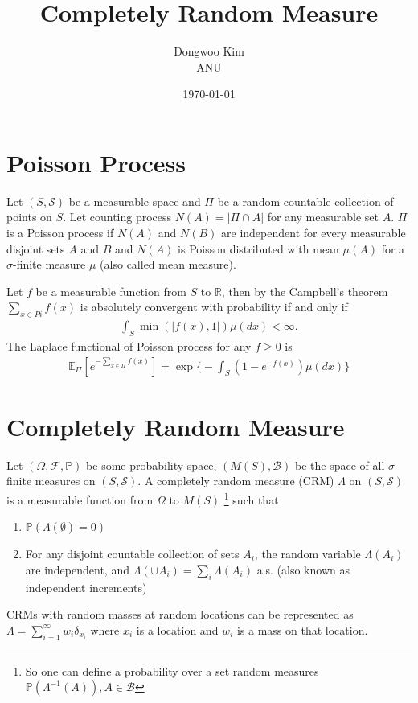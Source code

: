 \documentclass{article}
\title{Completely Random Measure}
\date{\today}
\author{Dongwoo Kim\\ANU}
\begin{document}
\maketitle

\section{Poisson Process}
\label{sec:pp}
Let $(S, \mathcal{S})$ be a measurable space and $\Pi$ be a random countable collection of points on $S$. Let  counting process $N(A) = |\Pi \cap A|$ for any measurable set $A$. $\Pi$ is a Poisson process if $N(A)$ and $N(B)$ are independent for every measurable disjoint sets $A$ and $B$ and $N(A)$ is Poisson distributed with mean $\mu(A)$ for a $\sigma$-finite measure $\mu$ (also called mean measure).

Let $f$ be a measurable function from $S$ to $\mathbb{R}$, then by the Campbell's theorem $\sum_{x\in Pi} f(x)$ is absolutely convergent with probability if and only if
\begin{align}
\int_{S} \min(|f(x), 1|)\mu(dx) < \infty.
\end{align}
The Laplace functional of Poisson process for any $f \ge 0$ is
\begin{align}
\mathbb{E}_{\Pi}[e^{-\sum_{x \in \Pi}f(x)}] = \exp \Bigg\{ - \int_{S} (1-e^{-f(x)})\mu(dx) \Bigg\}
\end{align}

\section{Completely Random Measure}
Let $(\Omega, \mathcal{F}, \mathbb{P})$ be some probability space, $(M(S), \mathcal{B})$ be the space of all $\sigma$-finite measures on $(S, \mathcal{S})$. A completely random measure (CRM) $\Lambda$ on $(S, \mathcal{S})$ is a measurable function from $\Omega$ to $M(S)$ \footnote{So one can define a probability over a set random measures $\mathbb{P}(\Lambda^{-1}(A)), A \in \mathcal{B}$} such that
\begin{enumerate}
\item $\mathbb{P}(\Lambda(\emptyset) = 0)$
\item For any disjoint countable collection of sets $A_i$, the random variable $\Lambda(A_i)$ are independent, and $\Lambda(\cup A_i) = \sum_i \Lambda(A_i)$ a.s. (also known as independent increments)
\end{enumerate}
CRMs with random masses at random locations can be represented as $\Lambda = \sum_{i=1}^{\infty} w_i \delta_{x_i}$ where $x_i$ is a location and $w_i$ is a mass on that location.
\end{document}
